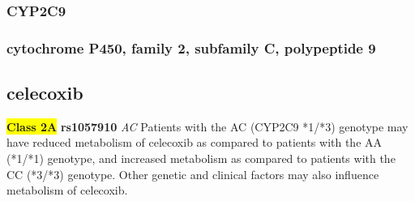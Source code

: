 \documentclass{book}
\begin{document}
\subsubsection{ CYP2C9 }
\subsubsection{ cytochrome P450, family 2, subfamily C, polypeptide 9 }

\subsection{ celecoxib }


\begin{center}


\textbf{\colorbox{yellow} {Class 2A}} \textbf{ rs1057910 } \textit{ AC }
Patients with the AC (CYP2C9 *1/*3) genotype may have reduced metabolism of celecoxib as compared to patients with the AA (*1/*1) genotype, and increased metabolism as compared to patients with the CC (*3/*3) genotype. Other genetic and clinical factors may also influence metabolism of celecoxib. 


\end{center}
\end{document}
